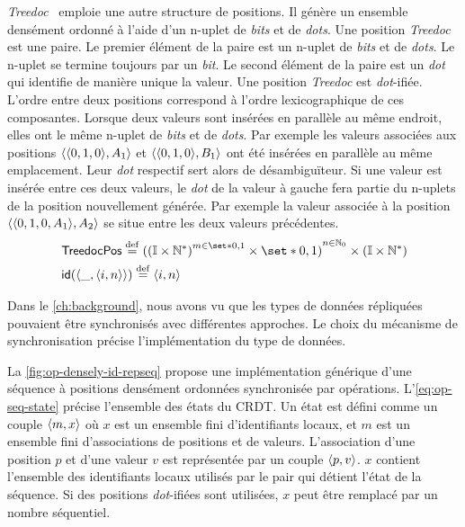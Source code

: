 \emph{Treedoc}~\autocite{preguica_2009_treedoc} emploie une autre structure de positions.
Il génère un ensemble densément ordonné à l'aide d'un n-uplet de \emph{bits} et de \emph{dots}.
Une position \emph{Treedoc} est une paire.
Le premier élément de la paire est un n-uplet de \emph{bits} et de \emph{dots}.
Le n-uplet se termine toujours par un \emph{bit}.
Le second élément de la paire est un \emph{dot} qui identifie de manière unique la valeur.
Une position \emph{Treedoc} est \emph{dot}-ifiée.
L'ordre entre deux positions correspond à l'ordre lexicographique de ces composantes.
Lorsque deux valeurs sont insérées en parallèle au même endroit, elles ont le même n-uplet de \emph{bits} et de \emph{dots}.
Par exemple les valeurs associées aux positions $\tuple{\tuple*{0, 1, 0},A_1}$ et $\tuple{\tuple*{0, 1, 0},B_1}$ ont été insérées en parallèle au même emplacement.
Leur \emph{dot} respectif sert alors de désambiguïteur.
Si une valeur est insérée entre ces deux valeurs, le \emph{dot} de la valeur à gauche fera partie du n-uplets de la position nouvellement générée.
Par exemple la valeur associée à la position $\tuple{\tuple*{0, 1, 0, A_1},A_2}$ se situe entre les deux valeurs précédentes.
%
\begin{align}
&\trm{TreedocPos} \defeq {({(\mathbb{I} \times \mathbb{N}^*)}^{m \in \set*{0, 1}} \times \set*{0, 1})}^{n \in \mathbb{N}_0} \times (\mathbb{I} \times \mathbb{N}^*)\\
&\trm{id}(\tuple*{\_, \tuple*{i, n}}) \defeq \tuple*{i, n}
\end{align}

\clearpage

Dans le \autoref{ch:background}, nous avons vu que les types de données répliquées pouvaient être synchronisés avec différentes approches.
Le choix du mécanisme de synchronisation précise l'implémentation du type de données.

La \autoref{fig:op-densely-id-repseq} propose une implémentation générique d'une séquence à positions densément ordonnées synchronisée par opérations.
L'\autoref{eq:op-seq-state} précise l'ensemble des états du \ac{CRDT}.
Un état est défini comme un couple $\tuple*{m, x}$ où $x$ est un ensemble fini d'identifiants locaux, et $m$ est un ensemble fini d'associations de positions et de valeurs.
L'association d'une position $p$ et d'une valeur $v$ est représentée par un couple $\tuple*{p, v}$.
$x$ contient l'ensemble des identifiants locaux utilisés par le pair qui détient l'état de la séquence.
Si des positions \emph{dot}-ifiées sont utilisées, $x$ peut être remplacé par un nombre séquentiel.

